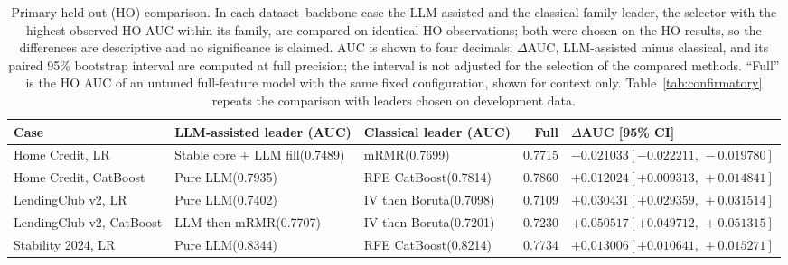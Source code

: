 \documentclass[final,5p,twocolumn]{elsarticle}
\begin{document}
\begin{table}[htbp]
\centering
\scriptsize
\setlength{\tabcolsep}{3pt}
\begin{threeparttable}
\caption{Primary held-out (HO) comparison. In each dataset--backbone case the LLM-assisted and the classical family leader, the selector with the highest observed HO AUC within its family, are compared on identical HO observations; both were chosen on the HO results, so the differences are descriptive and no significance is claimed. AUC is shown to four decimals; $\Delta$AUC, LLM-assisted minus classical, and its paired 95\% bootstrap interval are computed at full precision; the interval is not adjusted for the selection of the compared methods. ``Full'' is the HO AUC of an untuned full-feature model with the same fixed configuration, shown for context only. Table~\ref{tab:confirmatory} repeats the comparison with leaders chosen on development data.}
\label{tab:primary_results}
\begin{tabular}{@{}L{24mm}L{27mm}L{24mm}rL{40mm}@{}}
\toprule
Case & LLM-assisted leader (AUC) & Classical leader (AUC) & Full & $\Delta$AUC [95\% CI] \\
\midrule
Home Credit, LR & Stable core + LLM fill\newline (0.7489) & mRMR\newline (0.7699) & 0.7715 & $-0.021033$\newline $[-0.022211,\,-0.019780]$ \\
\addlinespace
Home Credit, CatBoost & Pure LLM\newline (0.7935) & RFE CatBoost\newline (0.7814) & 0.7860 & $+0.012024$\newline $[+0.009313,\,+0.014841]$ \\
\addlinespace
LendingClub v2, LR & Pure LLM\newline (0.7402) & IV then Boruta\newline (0.7098) & 0.7109 & $+0.030431$\newline $[+0.029359,\,+0.031514]$ \\
\addlinespace
LendingClub v2, CatBoost & LLM then mRMR\newline (0.7707) & IV then Boruta\newline (0.7201) & 0.7230 & $+0.050517$\newline $[+0.049712,\,+0.051315]$ \\
\addlinespace
Stability 2024, LR & Pure LLM\newline (0.8344) & RFE CatBoost\newline (0.8214) & 0.7734 & $+0.013006$\newline $[+0.010641,\,+0.015271]$ \\

\end{tabular}
\end{threeparttable}
\end{table}
\end{document}
